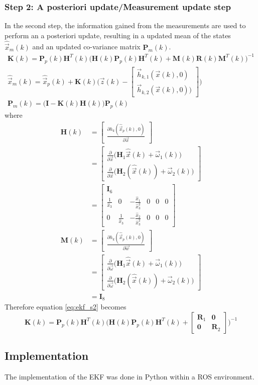 \subsubsection{Step 2: A posteriori update/Measurement update step}
In the second step, the information gained from the measurements are used to perform an a posteriori update, resulting in a updated mean of the states $\hat{\vec x}_m(k)$ and an updated co-variance matrix $\textbf{P}_m(k)$.
\begin{align}
	\textbf{K}(k) = \textbf{P}_p(k) \textbf{H}^T(k) \Big( \textbf{H}(k) \textbf{P}_p(k) \textbf{H}^T(k) + \textbf{M}(k) \textbf{R}(k) \textbf{M}^T(k)\Big)^{-1} \label{eq:ekf_s2}\\
	\hat{\vec x}_m(k) = \hat{\vec x}_p(k) + \textbf{K}(k) \Big( \vec z(k) - \begin{bmatrix}
	\vec h_{k,1}(\vec x(k), 0)\\
	\vec h_{k,2}(\vec x(k), 0))
	\end{bmatrix} \Big)\\
	\textbf{P}_m(k) = \big( \textbf{I} - \textbf{K}(k)\textbf{H}(k)\big) \textbf{P}_p(k)
\end{align}
where
\begin{align}
  \textbf{H}(k) &= \begin{bmatrix}
    \frac{\partial h_k(\hat{\vec x}_p(k), 0)}{\partial \vec x}
  \end{bmatrix}\\
  &= \begin{bmatrix}
		\frac{\partial}{\partial \vec x} \big( \textbf{H}_1 \hat{\vec x}(k) + \vec \omega_1(k) \big)\\
		\frac{\partial}{\partial \vec x} \big( \textbf{H}_2(\hat{\vec x}(k)) + \vec \omega_2(k) \big)
	\end{bmatrix}\\
	&= \begin{bmatrix}
		\textbf{I}_6\\
		\frac{1}{\hat{x}_3} & 0 & -\frac{\hat{x}_1}{\hat{x}^2_3} & 0 & 0 & 0\\
		0 & \frac{1}{\hat{x}_3} & -\frac{\hat{x}_2}{\hat{x}^2_3} & 0 & 0 & 0
	\end{bmatrix}\\
  \textbf{M}(k) & = \begin{bmatrix}
    \frac{\partial h_k(\hat{\vec x}_p(k), 0)}{\partial \vec w}
  \end{bmatrix}\\
  &= \begin{bmatrix}
		\frac{\partial}{\partial \vec \omega} \big( \textbf{H}_1 \hat{\vec x}(k) + \vec \omega_1(k) \big)\\
		\frac{\partial}{\partial \vec \omega} \big( \textbf{H}_2(\hat{\vec x}(k)) + \vec \omega_2(k) \big)
	\end{bmatrix}\\
	&= \textbf{I}_8
\end{align}
Therefore equation \ref{eq:ekf_s2} becomes
$$\textbf{K}(k) = \textbf{P}_p(k) \textbf{H}^T(k) \Big( \textbf{H}(k) \textbf{P}_p(k) \textbf{H}^T(k) + \begin{bmatrix}
	\textbf{R}_1 & \textbf{0}\\
	\textbf{0} &\textbf{R}_2
\end{bmatrix} \Big)^{-1}$$

\subsection{Implementation}
The implementation of the EKF was done in Python within a ROS environment.
